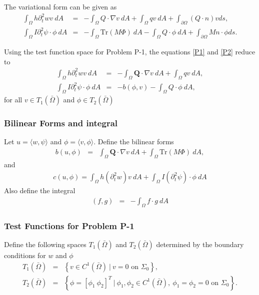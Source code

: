 \documentclass[../../main.tex]{subfiles}
\begin{document}
	The variational form can be given as
	\begin{align}
		\int_\Omega h \partial_t^2 w v \ dA & = & - \int_\Omega Q \cdot \nabla v \ dA + \int_\Omega q v \ dA + \int_{\partial\Omega} (Q\cdot n)v ds, \label{P1}\\
		\int_\Omega I \partial_t^2 \psi \cdot \phi \ dA & = & - \int_\Omega \textrm{Tr} (M \Phi) \ dA - \int_\Omega Q \cdot \phi \ dA + \int_{\partial\Omega} M n \cdot \phi ds. \label{P2}
	\end{align}

	Using the test function space for Problem P-1, the equations \eqref{P1} and \eqref{P2} reduce to
	\begin{eqnarray}
		\int_\Omega h \partial_t^2 w v \ dA & = & - \int_\Omega \mathbf{Q} \cdot \nabla v \ dA + \int_\Omega q v \ dA, \label{eq:P_Model:ProblemP1V1}\\
		\int_\Omega I \partial_t^2 \psi \cdot \phi \ dA & = & - b(\phi,v) - \int_\Omega Q \cdot \phi \ dA, \label{eq:P_Model:ProblemP1V2}
	\end{eqnarray}
	for all $v \in T_1(\bar{\Omega})$ and $\phi \in T_2(\bar{\Omega})$

	\subsubsection{Bilinear Forms and integral}\label{sssec:P_Model:BilinearForm}
	Let $u = \langle w, \psi \rangle$ and $\phi = \langle v, \phi \rangle$. Define the bilinear forms
	\begin{eqnarray*}
		b(u,\phi) & = & \int_\Omega \mathbf{Q} \cdot \nabla v \ dA + \int_{\Omega} \textrm{Tr}(M\Phi) \ dA,
	\end{eqnarray*}
	and
	\begin{eqnarray}
		c(u,\phi) = \int_\Omega h (\partial_t^2 w) v \ dA + \int_\Omega I (\partial_t^2 \psi) \cdot \phi \ dA \label{eq:2D_Model:Bilinear_c}
	\end{eqnarray}
	Also define the integral
	\begin{eqnarray}
		(f,g) &=& -\int_{\Omega} f\cdot g \ dA \label{eq:2D_Model:Bilinear_int}
	\end{eqnarray}
	
	
	\subsubsection{Test Functions for Problem P-1}\label{sssec:P_Model:TestfunctionsP1}
	Define the following spaces $T_1(\bar{\Omega})$ and $T_2(\bar{\Omega})$ determined by the boundary conditions for $w$ and $\phi$
	\begin{eqnarray*}
		T_1(\bar{\Omega}) & = & \left \{v \in C^1(\bar{\Omega})\ | \ v = 0 \textrm{ on } \Sigma_0\right\},\\ 
		T_2(\bar{\Omega}) & = & \left \{ \phi = \left[ \phi_1 \ \phi_2 \right]^T \ | \ \phi_1, \phi_2 \in C^1(\bar{\Omega}), \ \phi_1 = \phi_2 = 0 \textrm{ on } \Sigma_0 \right\}.
	\end{eqnarray*}
	
\end{document}
